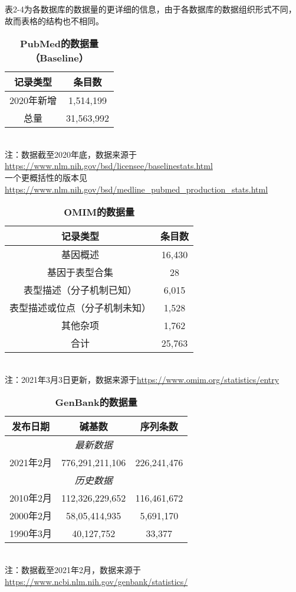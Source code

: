 \documentclass[cn,black,12pt,normal]{elegantnote}
\begin{document}
表2-4为各数据库的数据量的更详细的信息，由于各数据库的数据组织形式不同，故而表格的结构也不相同。
\begin{table}[H]
    \caption{\textbf{PubMed的数据量（Baseline）}}
    \centering
    \begin{tabular}{cc}
        \toprule
        记录类型&条目数\\
        \midrule
        2020年新增&1,514,199\\
        总量&31,563,992\\
        \bottomrule
    \end{tabular}
    \\\tiny{注：数据截至2020年底，数据来源于\url{https://www.nlm.nih.gov/bsd/licensee/baselinestats.html}}
    \\\tiny{一个更概括性的版本见\url{https://www.nlm.nih.gov/bsd/medline_pubmed_production_stats.html}}
\end{table}

\begin{table}[H]
    \caption{\textbf{OMIM的数据量}}
    \centering
    \begin{tabular}{cc}
        \toprule
        记录类型&条目数\\
        \midrule
        基因概述&16,430\\
        基因于表型合集&28\\
        表型描述（分子机制已知）&6,015\\
        表型描述或位点（分子机制未知）&1,528\\
        其他杂项&1,762\\
        合计&25,763\\
        \bottomrule
    \end{tabular}
    \\\tiny{注：2021年3月3日更新，数据来源于\url{https://www.omim.org/statistics/entry}}
\end{table}

\begin{table}[H]
    \caption{\textbf{GenBank的数据量}}
    \centering
    \begin{tabular}{ccc}
        \toprule
        发布日期&碱基数&序列条数\\
        \midrule
        &\textit{最新数据}&\\
        2021年2月&776,291,211,106&226,241,476\\
        \midrule
        &\textit{历史数据}&\\
        2010年2月&112,326,229,652&116,461,672\\
        2000年2月&58,05,414,935&5,691,170\\
        1990年3月&40,127,752&33,377\\
        \bottomrule
    \end{tabular}
    \\\tiny{注：数据截至2021年2月，数据来源于\url{https://www.ncbi.nlm.nih.gov/genbank/statistics/}}
\end{table}
\end{document}
